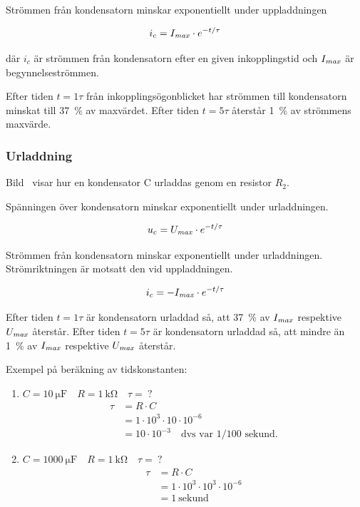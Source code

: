 Strömmen från kondensatorn minskar exponentiellt under uppladdningen

\[i_c = I_{\it max} \cdot e^{-t/\tau}\]

där
\(i_c\) är strömmen från kondensatorn efter en given inkopplingstid och 
\(I_{\it max}\) är begynnelseströmmen.

Efter tiden \(t = 1\tau\) från inkopplingsögonblicket har strömmen till
kondensatorn minskat till \qty{37}{\percent} av maxvärdet.
Efter tiden \(t = 5\tau\) återstår \qty{1}{\percent} av strömmens maxvärde.

\subsubsection{Urladdning}


Bild~ visar hur en kondensator C urladdas genom en
resistor \(R_2\).

Spänningen över kondensatorn minskar exponentiellt under urladdningen.

\[u_c = U_{\it max} \cdot e^{-t/\tau}\]

Strömmen från kondensatorn minskar exponentiellt under urladdningen.
Strömriktningen är motsatt den vid uppladdningen.

\[i_c = - I_{\it max} \cdot e^{-t/\tau}\]

Efter tiden \(t = 1\tau\) är kondensatorn urladdad så, att \qty{37}{\percent} av
\(I_{\it max}\) respektive \(U_{\it max}\) återstår.
Efter tiden \(t = 5\tau\) är kondensatorn urladdad så, att mindre än
\qty{1}{\percent} av \(I_{\it max}\) respektive \(U_{\it max}\) återstår.

Exempel på beräkning av tidskonstanten:
\begin{enumerate}
\item \(C = \qty{10}{\micro\farad} \quad R = \qty{1}{\kilo\ohm} \quad \tau =\ ?\)
  \begin{align*}
    \tau &= R \cdot C \\
    &= 1 \cdot 10^3 \cdot 10 \cdot 10^{-6} \\
    &= 10 \cdot 10^{-3} \quad \text{dvs var 1/100 sekund.}
  \end{align*}
\item \(C = \qty{1000}{\micro\farad} \quad R = \qty{1}{\kilo\ohm} \quad \tau =\ ?\)
  \begin{align*}
    \tau &= R \cdot C \\
    &= 1 \cdot 10^3 \cdot 10^3 \cdot 10^{-6} \\
    &= 1\ \text{sekund}
  \end{align*}
\end{enumerate}

